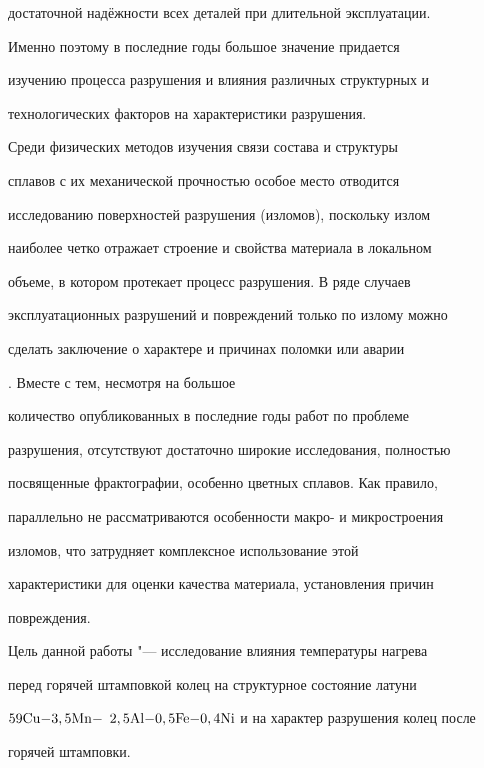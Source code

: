 достаточной надёжности всех деталей при длительной эксплуатации.

Именно поэтому в последние годы большое значение придается

изучению процесса разрушения и влияния различных структурных и

технологических факторов на характеристики разрушения.



Среди физических методов изучения связи состава и структуры

сплавов с их механической прочностью особое место отводится

исследованию поверхностей разрушения (изломов), поскольку излом

наиболее четко отражает строение и свойства материала в локальном

объеме, в котором протекает процесс разрушения. В ряде случаев

эксплуатационных разрушений и повреждений только по излому можно

сделать заключение о характере и причинах поломки или аварии

\cite{pugacheva:bib4}. Вместе с тем, несмотря на большое

количество опубликованных в последние годы работ по проблеме

разрушения, отсутствуют достаточно широкие исследования, полностью

посвященные фрактографии, особенно цветных сплавов. Как правило,

параллельно не рассматриваются особенности макро- и микростроения

изломов, что затрудняет комплексное использование этой

характеристики для оценки качества материала, установления причин

повреждения.



Цель данной работы "--- исследование влияния температуры нагрева

перед горячей штамповкой колец на структурное состояние латуни

$\rm 59Cu{-}3,5Mn{-}$ $\rm 2,5Al{-}0,5Fe{-}0,4Ni$ и на характер разрушения колец после

горячей штамповки.



\smallskip




